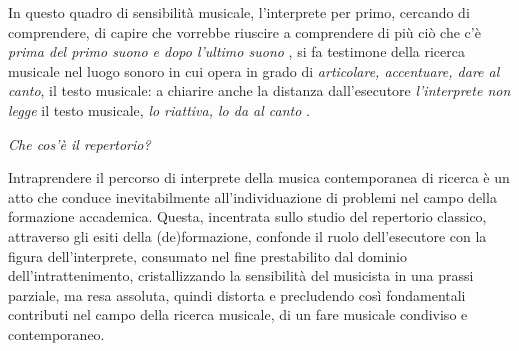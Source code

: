 \documentclass{gs-adonis}
\begin{document}
In questo quadro di sensibilità musicale, l'interprete per primo, cercando di
comprendere, di capire che vorrebbe riuscire a comprendere di più ciò che c'è
\emph{prima del primo suono e dopo l'ultimo suono} \cite{Cacciari1995}, si fa
testimone della ricerca musicale nel luogo sonoro in cui opera in grado di
\emph{articolare, accentuare, dare al canto}, il testo musicale: a chiarire
anche la distanza dall'esecutore \emph{l'interprete non legge} il testo
musicale, \emph{lo riattiva, lo da al canto} \cite{Cacciari1995}.

\emph{Che cos'è il repertorio?}

Intraprendere il percorso di interprete della musica contemporanea di ricerca è
un atto che conduce inevitabilmente all'individuazione di problemi nel campo
della formazione accademica. Questa, incentrata sullo studio del repertorio
classico, attraverso gli esiti della (de)formazione, confonde il ruolo
dell'esecutore con la figura dell'interprete, consumato nel fine prestabilito
dal dominio dell'intrattenimento, cristallizzando la sensibilità del musicista
in una prassi parziale, ma resa assoluta, quindi distorta e precludendo così fondamentali contributi nel campo della ricerca musicale, di un fare musicale condiviso e contemporaneo.


%

%
\end{document}
